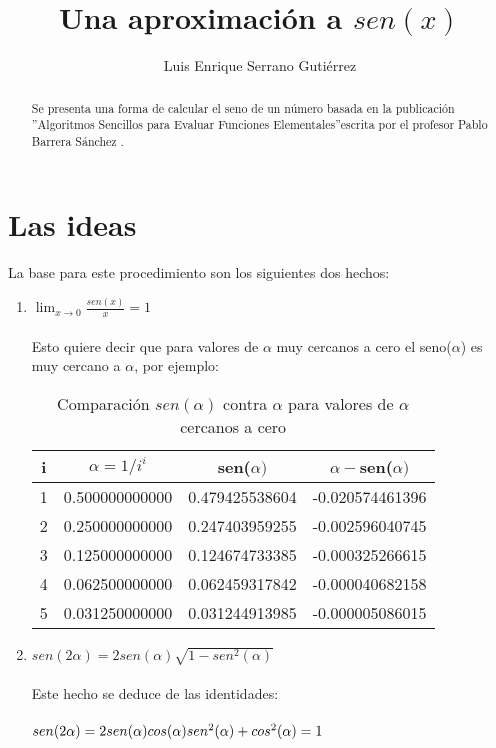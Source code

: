 \documentclass[letter,12pt]{article}
\title{Una aproximación a $sen(x)$}
\author{Luis Enrique Serrano Gutiérrez}
\begin{document}
\maketitle


\begin{abstract}
Se presenta una forma de calcular el seno de un número basada en la publicación ''Algoritmos Sencillos para Evaluar Funciones Elementales''escrita por el profesor Pablo Barrera Sánchez \cite{AlgoritmosPablo}.
\end{abstract}

\section*{Las ideas}
La base para este procedimiento son los siguientes dos hechos: 
\begin{enumerate}
	\item $\lim_{x\to 0} \frac{sen(x)}{x} = 1$\\\\	
Esto quiere decir que para valores de $\alpha$ muy cercanos a cero el seno($\alpha$) es muy cercano a $\alpha$, por ejemplo:
	\begin{table}[h!]
		\centering
		\begin{tabular}{ |c|c|c|c| } 
		  \hline
		 	i & $\alpha = 1/i^i$ & sen($\alpha)$ & $\alpha - $sen($\alpha)$ \\
		  \hline
			1 & 0.500000000000 & 0.479425538604 & -0.020574461396\\
			2 & 0.250000000000 & 0.247403959255 & -0.002596040745\\
			3 & 0.125000000000 & 0.124674733385 & -0.000325266615\\
			4 & 0.062500000000 & 0.062459317842 & -0.000040682158\\
			5 & 0.031250000000 & 0.031244913985 & -0.000005086015\\	  
		 \hline
		\end{tabular}
	\caption{Comparación $sen(\alpha)$ contra $\alpha$ para valores de $\alpha$ cercanos a cero}
	\label{table:1}
	\end{table}	
	\enlargethispage*\baselineskip{}
	\item $sen(2\alpha)=2sen(\alpha)\sqrt{1-sen^2(\alpha)}$\\\\
	Este hecho se deduce de las identidades:\\\\
	$sen(2\alpha)=2sen(\alpha)cos(\alpha)\\
	sen^2(\alpha)+cos^2(\alpha)=1$
\end{enumerate}
\end{document}
